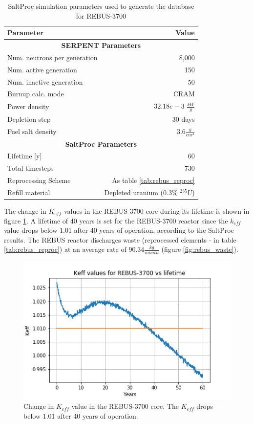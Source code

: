 \begin{table}[h]
	\centering
	\caption{SaltProc simulation parameters used to generate the database for REBUS-3700}
	\begin{tabular}{lr}
		\hline
		\textbf{Parameter} & \textbf{Value}\\
		\hline
		\multicolumn{2}{c}{\textbf{SERPENT Parameters}} \\
		\hline
		Num. neutrons per generation & 8,000 \\
		Num. active generation & 150\\
		Num. inactive generation & 50 \\
		Burnup calc. mode & CRAM \\
		Power density & $32.18e-3$ $\frac{kW}{g}$ \\ 
		Depletion step & 30 days\\
		Fuel salt density & $3.6 \frac{g}{cm^3}$ \\
		\hline
		\multicolumn{2}{c}{\textbf{SaltProc Parameters}} \\
		\hline
		Lifetime [y]  & 60 \\
		Total timesteps & 730 \\
		Reprocessing Scheme & As table \ref{tab:rebus_reproc}\\
		Refill material & Depleted uranium ($0.3\%$ $^{235}U$) \\
		\hline
	\end{tabular}
	\label{tab:saltproc-run-params}
\end{table}

The change in $K_{eff}$ values in the REBUS-3700 core during its lifetime is shown in figure \ref{fig:keff}.
A lifetime of 40 years is set for the REBUS-3700 reactor since the $k_{eff}$
value drops below 1.01 after 40 years of operation, according to the SaltProc results.
The REBUS reactor discharges
waste (reprocessed elements - in table \ref{tab:rebus_reproc}) at an average rate of
$90.34 \frac{kg}{month}$ (figure \ref{fig:rebus_waste}).


\begin{figure}[htbp!]
	\begin{center}
		\includegraphics[scale=0.7]{./images/us/keff.png}
	\end{center}
	\caption{Change in $K_{eff}$ value in the REBUS-3700 core. The $K_{eff}$ drops below
		1.01 after 40 years of operation.}
	\label{fig:keff}
\end{figure}

